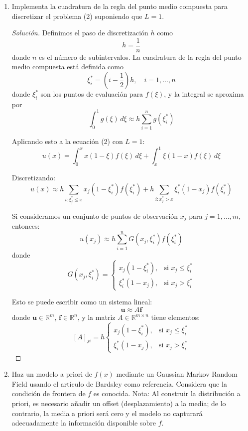 \documentclass[12pt,spanish,mexico]{article}
\numberwithin{equation}{section}
\theoremstyle{definition}
\theoremstyle{remark}
\newenvironment{solution}{\begin{proof}[Solución]}{\end{proof}}
\begin{document}
\begin{enumerate}
\item Implementa la cuadratura de la regla del punto medio compuesta para discretizar el problema (2) suponiendo que $L = 1$.

\begin{solution}
Definimos el paso de discretización $h$ como 
\[
h = \frac{1}{n}
\]
donde $n$ es el número de subintervalos. La cuadratura de la regla del punto medio compuesta está definida como
\[
\xi_i^* = \left(i - \frac{1}{2}\right)h, \quad i = 1, \dots, n
\]
donde $\xi_i^*$ son los puntos de evaluación para $f(\xi)$, y la integral se aproxima por
\[
\int_{0}^{1} g(\xi)\,d\xi \approx h\sum_{i=1}^{n} g(\xi_i^*)
\]

Aplicando esto a la ecuación (2) con $L=1$:
\[
u(x) = \int_{0}^{x} x(1-\xi) f(\xi) \, d\xi + \int_{x}^{1} \xi (1-x) f(\xi) \, d\xi
\]

Discretizando:
\[
u(x) \approx h \sum_{i: \xi_j^* \le x} x_j(1-\xi_i^*) f(\xi_i^*) + h \sum_{i: x_j^* > x} \xi_i^*(1-x_j) f(\xi_i^*)
\]

Si consideramos un conjunto de puntos de observación $x_j$ para $j = 1, \dots, m$, entonces:
\[
u(x_j) \approx h \sum_{i=1}^{n} G(x_j, \xi_i^*) f(\xi_i^*)
\]
donde
\[
G(x_j, \xi_i^*) = \begin{cases}
x_j(1-\xi^*_i), & \text{si } x_j \le \xi_i^* \\
\xi_i^*(1-x_j), & \text{si } x_j > \xi_i^*
\end{cases}
\]

Esto se puede escribir como un sistema lineal:
\[
\mathbf{u} \approx A \mathbf{f}
\]
donde $\mathbf{u} \in \mathbb{R}^m$, $\mathbf{f} \in \mathbb{R}^n$, y la matriz $A \in \mathbb{R}^{m \times n}$ tiene elementos:
\[
\left[A\right]_{ji} = h \begin{cases}
x_j(1-\xi^*_i), & \text{si } x_j \le \xi_i^* \\
\xi_i^*(1-x_j), & \text{si } x_j > \xi_i^*
\end{cases}
\]
\end{solution}

\item Haz un modelo a priori de $f(x)$ mediante un Gaussian Markov Random Field usando el artículo de Bardsley como referencia. Considera que la condición de frontera de $f$ es conocida. Nota: Al construir la distribución a priori, es necesario añadir un offset (desplazamiento) a la media; de lo contrario, la media a priori será cero y el modelo no capturará adecuadamente la información disponible sobre $f$.


\end{enumerate}
\end{document}

